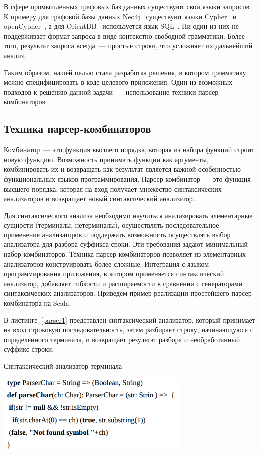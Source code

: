 В сфере промышленных графовых баз данных существуют свои языки запросов. К примеру для графовой базы данных Neo4j~\cite{Neo4j} существуют языки Cypher~\cite{Cypher} и openCypher~\cite{openCypher}, а для OrientDB~\cite{OrientDB} используется язык SQL~\cite{Sql}. Ни один из них не поддерживает формат запроса в виде контекстно-свободной грамматики. Более того, результат запроса всегда~--- простые строки, что усложняет их дальнейший анализ.

Таким образом, нашей целью стала разработка решения, в котором грамматику можно специфицировать в коде целевого приложения. Один из возможных подходов к решению данной задачи~--- использование техники парсер-комбинаторов~\cite{HOFunParsing}.

\subsection{Техника парсер-комбинаторов}
Комбинатор~--- это функция высшего порядка, которая из набора функций строит новую функцию. Возможность принимать функции как аргументы, комбинировать их и возвращать как результат является важной особенностью функциональных языков программирования. Парсер-комбинатор~--- это функция высшего порядка, которая на вход получает множество синтаксических анализаторов и возвращает новый синтаксический анализатор. 

Для синтаксического анализа необходимо научиться анализировать элементарные сущности (терминалы, нетерминалы), осуществлять последовательное применение анализаторов и поддержать возможность осуществлять выбор анализатора для разбора суффикса сроки. Эти требования задают минимальный набор комбинаторов. Техника парсер-комбинаторов позволяет из элементарных анализаторов конструировать более сложные. Интеграция с языком программирования приложения, в котором применяется синтаксический анализатор, добавляет гибкости и расширяемости в сравнении с генераторами синтаксических анализаторов. Приведём пример реализации простейшего парсер-комбинатора на Scala.

В листинге~\ref{parser1} представлен синтаксический анализатор, который принимает на вход строковую последовательность, затем разбирает строку, начинающуюся с определенного терминала, и возвращает результат разбора и необработанный суффикс строки.

\begin{listing}
\caption{Синтаксический анализатор терминала}
\label{parser1}
\centering
\includegraphics[width=0.7\textwidth]{Smolina/pics/parser1.png}
\end{listing}

